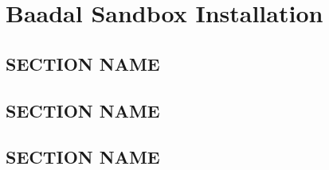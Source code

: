 \chapter{Baadal Sandbox Installation}


\section{SECTION NAME}
\lipsum[2]

\section{SECTION NAME}
\lipsum[3]

\section{SECTION NAME}
\lipsum[2]